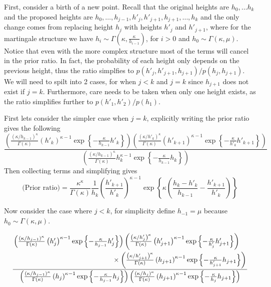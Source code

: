 \documentclass[../main.tex]{subfiles}
\begin{document}
First, consider a birth of a new point. Recall that the original heights are $h_0, \dots h_k$ and the proposed heights are $h_0, \dots, h_{j-1}, h'_j, h'_{j+1}, h_{j+1}, \dots, h_k$ and the only change comes from replacing height $h_j$ with heights $h'_j$ and $h'_{j+1}$, where for the martingale structure we have $h_i \sim \Gamma(\kappa, \frac{\kappa}{h_{i-1}})$, for $i>0$ and $h_0 \sim \Gamma(\kappa,\mu)$.  Notice that even with the more complex structure most of the terms will cancel in the prior ratio. In fact, the probability of each height only depends on the previous height, thus the ratio simplfies to $p(h'_{j}, h'_{j+1},h_{j+1})/p(h_j,h_{j+1}) $. We will need to spilt into 2 cases, for when $j<k$ and $j=k$ since $h_{j+1}$ does not exist if $j=k$. Furthermore, care needs to be taken when only one height exists, as the ratio simplifies further to $p(h'_{1}, h'_{2})/p(h_1)$.

First lets consider the simpler case when $j=k$, explicitly writing the prior ratio gives the following 
\begin{equation}
\frac{\left( \frac{\left(\kappa /h_{k-1}\right)^\kappa}{\Gamma \left( \kappa \right)} \left( h'_k \right)^{\kappa-1} \exp \left\{ -\frac{\kappa}{h_{k-1}}h'_k \right\}     \right) 
\left( \frac{\left(\kappa /h'_{k}\right)^\kappa}{\Gamma \left( \kappa \right)} \left( h'_{k+1} \right)^{\kappa-1} \exp \left\{ -\frac{\kappa}{h'_{k}}h'_{k+1} \right\}     \right)}
{\left( \frac{\left(\kappa /h_{k-1}\right)^\kappa}{\Gamma \left( \kappa \right)}  h_k ^{\kappa-1} \exp \left\{ -\frac{\kappa}{h_{k-1}}h_k \right\}     \right)}
\end{equation}
 Then collecting terms and simplifying gives \begin{equation}
\text{(Prior ratio)} = \frac{\kappa^\kappa}{\Gamma \left( \kappa \right)} \frac{1}{h_k} \left(\frac{h'_{k+1}}{h'_k}\right)^{\kappa-1} \exp \left\{ \kappa \left( \frac{h_k -h'_k}{h_{k-1}} - \frac{h'_{k+1}}{h'_k}  \right) \right\}
\end{equation}

Now consider the case where $j<k$, for simplicity define $h_{-1} = \mu$  because $h_0 \sim \Gamma (\kappa, \mu)$. 

\begin{equation}
\dfrac{\splitdfrac{\left( \frac{\left(\kappa /h_{j-1}\right)^\kappa}{\Gamma \left( \kappa \right)} \left( h'_j \right)^{\kappa-1} \exp \left\{ -\frac{\kappa}{h_{j-1}}h'_j \right\}     \right) 
\left( \frac{\left(\kappa /h'_{j}\right)^\kappa}{\Gamma \left( \kappa \right)} \left( h'_{j+1} \right)^{\kappa-1} \exp \left\{ -\frac{\kappa}{h'_{j}}h'_{j+1} \right\}     \right)  }{
\times \left( \frac{\left(\kappa /h'_{j+1}\right)^\kappa}{\Gamma \left( \kappa \right)} \left( h_{j+1} \right)^{\kappa-1} \exp \left\{ -\frac{\kappa}{h'_{j+1}}h_{j+1} \right\}     \right)}}
{\left( \frac{\left(\kappa /h_{j-1}\right)^\kappa}{\Gamma \left( \kappa \right)} \left( h_j \right)^{\kappa-1} \exp \left\{ -\frac{\kappa}{h_{j-1}}h_j \right\}     \right)
\left( \frac{\left(\kappa /h_{j}\right)^\kappa}{\Gamma \left( \kappa \right)} \left( h_{j+1} \right)^{\kappa-1} \exp \left\{ -\frac{\kappa}{h_{j}}h_{j+1} \right\}     \right)}
\end{equation}
\end{document}
